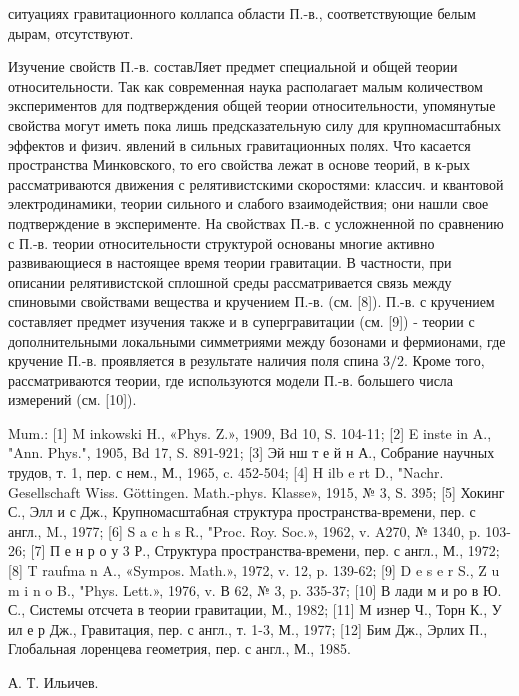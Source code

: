 \documentclass[10pt]{article}
\begin{document}
ситуациях гравитационного коллапса области П.-в., соответствующие белым дырам, отсутствуют.



Изучение свойств П.-в. составЛяет предмет специальной и общей теории относительности. Так как современная наука располагает малым количеством экспериментов для подтверждения общей теории относительности, упомянутые свойства могут иметь пока лишь предсказательную силу для крупномасштабных эффектов и физич. явлений в сильных гравитационных полях. Что касается пространства Минковского, то его свойства лежат в основе теорий, в к-рых рассматриваются движения с релятивистскими скоростями: классич. и квантовой электродинамики, теории сильного и слабого взаимодействия; они нашли свое подтверждение в эксперименте. На свойствах П.-в. с усложненной по сравнению с П.-в. теории относительности структурой основаны многие активно развивающиеся в настоящее время теории гравитации. В частности, при описании релятивистской сплошной среды рассматривается связь между спиновыми свойствами вещества и кручением П.-в. (см. [8]). П.-в. с кручением составляет предмет изучения также и в супергравитации (см. [9]) - теории с дополнительными локальными симметриями между бозонами и фермионами, где кручение П.-в. проявляется в результате наличия поля спина $3 / 2$. Кроме того, рассматриваются теории, где используются модели П.-в. большего числа измерений (см. [10]).



Mum.: [1] M inkowski H., «Phys. Z.», 1909, Bd 10, S. 104-11; [2] E inste in A., "Ann. Phys.", 1905, Bd 17, S. 891-921; [3] Эй нш т е й н А., Собрание научных трудов, т. 1, пер. с нем., М., 1965, c. 452-504; [4] H ilb e rt D., "Nachr. Gesellschaft Wiss. Göttingen. Math.-phys. Klasse», 1915, № 3, S. 395; [5] Хокинг С., Элл и с Дж., Крупномасштабная структура пространства-времени, пер. с англ., M., 1977; [6] S a c h s R., "Proc. Roy. Soc.», 1962, v. A270, № 1340, p. 103-26; [7] П е н р о у 3 Р., Структура пространства-времени, пер. с англ., М., 1972; [8] T raufma n A., «Sympos. Math.», 1972, v. 12, p. 139-62; [9] D e s e r S., Z u m i n o B., "Phys. Lett.», 1976, v. В 62, № 3, p. 335-37; [10] В лади м и ро в Ю. С., Системы отсчета в теории гравитации, М., 1982; [11] М изнер Ч., Торн К., У ил е р Дж., Гравитация, пер. с англ., т. 1-3, М., 1977; [12] Бим Дж., Эрлих П., Глобальная лоренцева геометрия, пер. с англ., М., 1985.



А. Т. Ильичев.
\end{document}
